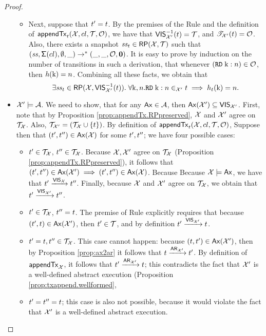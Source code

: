 \begin{proof}
\begin{itemize}
\begin{itemize}
			\item Next, suppose that $t' = t$.
			By the premises of the Rule  and the definition of $\mathsf{appendTx}_{t}(\mathcal{X}, cl, \mathcal{T}, \mathcal{O})$, we 
			have that ${\mathsf{VIS}}_{\mathcal{X}'}^{-1}(t) = \mathcal{T}$, and $\mathscr{T}_{\mathcal{X}'}(t) = \mathcal{O}$. 
			Also, there exists a snapshot $\mathit{ss}_{t} \in \mathsf{RP}(\mathcal{X}, \mathcal{T})$ such that $(\mathit{ss},\mathsf{\Sigma}(cl), \emptyset, \_) \rightarrow^{\ast}  
			(\_, \_, \mathcal{O}, \mathbf{0})$. It is easy to prove by induction on the number of transitions in such a derivation, that 
			whenever $({{\tt RD}}\;\mathrm{k} : n) \in \mathcal{O}$, then $h(\mathrm{k}) = n$. Combining all these facts, 
			we obtain that 
			\[
			\exists \mathit{ss}_{t} \in \mathsf{RP}(\mathcal{X}, {\mathsf{VIS}}^{-1}_{\mathcal{X}'}(t)).\; \forall \mathrm{k},n.{{\tt RD}}\;\mathrm{k}:n \in_{\mathcal{X}'} t 
			\implies h_{t}(\mathrm{k}) = n.
			\]
		\end{itemize}
		\item $\mathcal{X}' \models \mathcal{A}$. We need to show, that for any $\mathsf{Ax} \in \mathcal{A}$, then 
		$\mathsf{Ax}(\mathcal{X}') \subseteq {\mathsf{VIS}}_{\mathcal{X}'}$. 
		First, note that by Proposition \ref{prop:appendTx.RPpreserved}, $\mathcal{X}$ and $\mathcal{X}'$ 
		agree on $\mathcal{T}_{\mathcal{X}}$. Also, $\mathcal{T}_{\mathcal{X}'} = (\mathcal{T}_{\mathcal{X}} \cup \{t\})$. 
		By definition of $\mathsf{appendTx}_{t}(\mathcal{X}, cl, \mathcal{T}, \mathcal{O})$, 
		Suppose then that  $(t', t'') \in \mathsf{Ax}(\mathcal{X})$ for some $t', t''$; we have four possible cases:
		\begin{itemize}
			\item $t' \in \mathcal{T}_{\mathcal{X}}$, $t'' \in \mathcal{T}_{\mathcal{X}}$. Because $\mathcal{X}, \mathcal{X}'$ agree on $\mathcal{T}_{\mathcal{X}}$ 
			(Proposition \ref{prop:appendTx.RPpreserved}), 
			it follows that $(t', t'') \in \mathsf{Ax}(\mathcal{X}') \implies (t', t'') \in \mathsf{Ax}(\mathcal{X})$. Because 
			Because $\mathcal{X} \models \mathsf{Ax}$, we have that $t' \xrightarrow{{\mathsf{VIS}}_{\mathcal{X}}} t''$. Finally, 
			because $\mathcal{X}$ and $\mathcal{X}'$ agree on $\mathcal{T}_{\mathcal{X}}$, we obtain that $t' \xrightarrow{{\mathsf{VIS}}_{\mathcal{X}'}} t''$. 
			\item $t' \in \mathcal{T}_{\mathcal{X}}$, $t'' = t$. The premise of Rule  explicitly requires that 
			because $(t', t) \in \mathsf{Ax}(\mathcal{X}')$, then $t' \in \mathcal{T}$, and by definition $t' \xrightarrow{{\mathsf{VIS}}_{\mathcal{X}'}} t$.
			\item $t' = t, t'' \in \mathcal{T}_{\mathcal{X}}$. This case cannot happen: because $(t, t') \in \mathsf{Ax}(\mathcal{X}')$, 
			then by Proposition \ref{prop:ax2ar} it follows that $t \xrightarrow{{\sf{AR}}_{\mathcal{X}'}} t'$. By definition of 
			$\mathsf{appendTx}_{\mathcal{X}}$, it follows that $t' \xrightarrow{{\sf{AR}}_{\mathcal{X}'}} t$; this contradicts the 
			fact that $\mathcal{X}'$ is a well-defined abstract execution (Proposition \ref{prop:txappend.wellformed},
			\item $t' = t'' = t$; this case is also not possible, because it would violate the fact 
			that $\mathcal{X}'$ is a well-defined abstract execution.
		\end{itemize}
	\end{itemize}
\end{proof}

